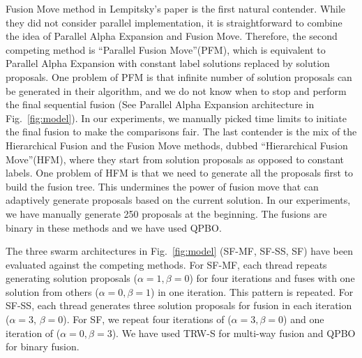 \noindent Fusion Move method in Lempitsky's paper is the first natural
contender. While they did not consider parallel implementation, it is
straightforward to combine the idea of Parallel Alpha Expansion and
Fusion Move. Therefore, the second competing method is ``Parallel Fusion
Move''(PFM), which is equivalent to Parallel Alpha Expansion with constant
label solutions replaced by solution proposals.
%
One problem of PFM is that infinite number of solution proposals can be
generated in their algorithm, and we do not know when to stop and
perform the final sequential fusion (See Parallel Alpha Expansion
architecture in Fig.~\ref{fig:model}). In our experiments, we manually
picked time limits to initiate the final fusion to make the comparisons
fair.
%
The last contender is the mix of the Hierarchical Fusion and the Fusion
Move methods, dubbed ``Hierarchical Fusion Move''(HFM), where they
start from solution proposals as opposed to constant labels. One problem
of HFM is that we need to generate all the proposals first to build the
fusion tree. This undermines the power of fusion move that can
adaptively generate proposals based on the current solution. In our
experiments, we have manually generate 250 proposals at the
beginning.
The fusions are binary in these methods and we have used QPBO.


\noindent
The three swarm architectures in Fig.~\ref{fig:model} (SF-MF, SF-SS, SF)
have been evaluated against the competing methods. For SF-MF, each
thread repeats generating solution proposals ($\alpha=1, \beta=0$) for
four iterations and fuses with one solution from others ($\alpha=0,
\beta=1$) in one iteration. This pattern is repeated. For SF-SS, each
thread generates three solution proposals for fusion in each iteration
($\alpha=3$, $\beta=0$). For SF, we repeat four iterations of
($\alpha=3, \beta=0$) and  one iteration of ($\alpha=0, \beta=3$).
We have used TRW-S for multi-way fusion and QPBO for binary fusion.
%
%
